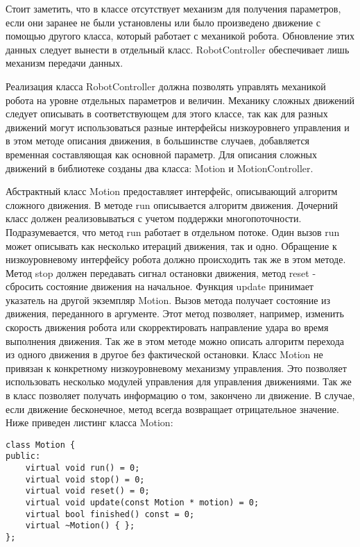 Стоит заметить, что в классе отсутствует механизм для получения параметров, если они заранее не были установлены или было произведено движение с помощью другого класса, который работает с механикой робота. Обновление этих данных следует вынести в отдельный класс. RobotController обеспечивает лишь механизм передачи данных.

Реализация класса RobotController должна позволять управлять механикой робота на уровне отдельных параметров и величин. Механику сложных движений следует описывать в соответствующем для этого классе, так как для разных движений могут использоваться разные интерфейсы низкоуровнего управления и в этом методе описания движения, в большинстве случаев, добавляется временная составляющая как основной параметр. Для описания сложных движений в библиотеке созданы два класса: Motion и MotionController.

Абстрактный класс Motion предоставляет интерфейс, описывающий алгоритм сложного движения. В методе run описывается алгоритм движения. Дочерний класс должен реализовываться с учетом поддержки многопоточности. Подразумевается, что метод run работает в отдельном потоке. Один вызов run может описывать как несколько итераций движения, так и одно. Обращение к низкоуровневому интерфейсу робота должно происходить так же в этом методе. Метод stop должен передавать сигнал остановки движения, метод reset - сбросить состояние движения на начальное. Функция update принимает указатель на другой экземпляр Motion. Вызов метода получает состояние из движения, переданного в аргументе. Этот метод позволяет, например, изменить скорость движения робота или скорректировать направление удара во время выполнения движения. Так же в этом методе можно описать алгоритм перехода из одного движения в другое без фактической остановки. Класс Motion не привязан к конкретному низкоуровневому механизму управления. Это позволяет использовать несколько модулей управления для управления движениями. Так же в класс позволяет получать информацию о том, закончено ли движение. В случае, если движение бесконечное, метод всегда возвращает отрицательное значение. Ниже приведен листинг класса Motion:

\lstset{language=C++}
\begin{lstlisting}
class Motion {
public:
    virtual void run() = 0;
    virtual void stop() = 0;
    virtual void reset() = 0;
    virtual void update(const Motion * motion) = 0;
    virtual bool finished() const = 0;
    virtual ~Motion() { };
};
\end{lstlisting}


